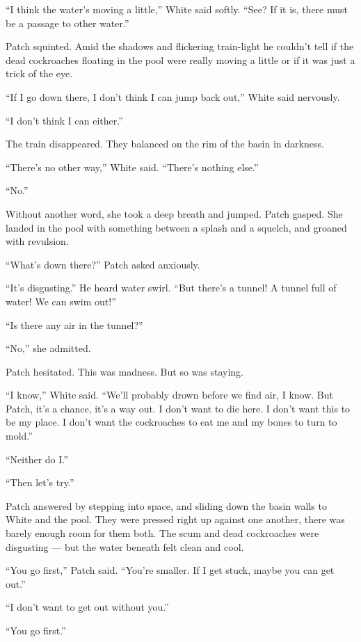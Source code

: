 \documentclass[ebook,oneside,openany,17pt]{memoir}
\newenvironment{tolerant}[1]{%
  \par\tolerance=#1\relax
}{%
  \par
}
\begin{document}
“I think the water’s moving a little,” White said softly. “See? If it
is, there must be a passage to other water.”

Patch squinted. Amid the shadows and flickering train-light he
couldn’t tell if the dead cockroaches floating in the pool were really
moving a little or if it was just a trick of the eye.

“If I go down there, I don’t think I can jump back out,” White said
nervously.

“I don’t think I can either.”

The train disappeared. They balanced on the rim of the basin in
darkness.

“There’s no other way,” White said. “There’s nothing else.”

“No.”

Without another word, she took a deep breath and jumped. Patch
gasped. She landed in the pool with something between a splash and a
squelch, and groaned with revulsion.

“What’s down there?” Patch asked anxiously.

\begin{tolerant}{500}
“It’s disgusting.” He heard water swirl. “But there’s a tunnel! A
tunnel full of water! We can swim out!”
\end{tolerant}

“Is there any air in the tunnel?”

“No,” she admitted.

Patch hesitated. This was madness. But so was staying.

“I know,” White said. “We’ll probably drown before we find air, I
know. But Patch, it’s a chance, it’s a way out. I don’t want to die
here. I don’t want this to be my place. I don’t want the cockroaches
to eat me and my bones to turn to mold.”

“Neither do I.”

“Then let’s try.”

Patch answered by stepping into space, and sliding down the basin
walls to White and the pool. They were pressed right up against one
another, there was barely enough room for them both. The scum and dead
cockroaches were disgusting — but the water beneath felt clean and
cool.

“You go first,” Patch said. “You’re smaller. If I get stuck, maybe you
can get out.”

“I don’t want to get out without you.”

“You go first.”
\end{document}
